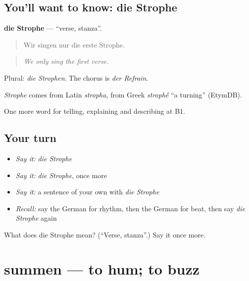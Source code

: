 \subsection*{You'll want to know: die Strophe}
\textbf{die Strophe} — \textquotedblleft{}verse, stanza\textquotedblright{}.

\begin{quote}
Wir singen nur die erste Strophe.
\end{quote}

\begin{quote}
\emph{We only sing the first verse.}
\end{quote}

Plural: \emph{die Strophen}. The chorus is \emph{der Refrain}.

\begin{cousinweb}
\emph{Strophe} comes from Latin \emph{stropha}, from Greek \emph{stroph\'{\={e}}} \textquotedblleft{}a turning\textquotedblright{} (EtymDB).
\end{cousinweb}

\begin{grammarlens}[title={What you've built}]
One more word for telling, explaining and describing at B1.
\end{grammarlens}

\subsection*{Your turn}
\begin{itemize}
\raggedright
  \item \emph{Say it:} \emph{die Strophe}
  \item \emph{Say it:} \emph{die Strophe}, once more
  \item \emph{Say it:} a sentence of your own with \emph{die Strophe}
  \item \emph{Recall:} say the German for rhythm, then the German for beat, then say \emph{die Strophe} again
\end{itemize}

\begin{tcolorbox}[breakable,colback=teal!4,colframe=teal!35!black,title={Before you move on}]
What does die Strophe mean? (\textquotedblleft{}Verse, stanza\textquotedblright{}.) Say it once more.
\end{tcolorbox}
\section[summen]{summen — to hum; to buzz}

